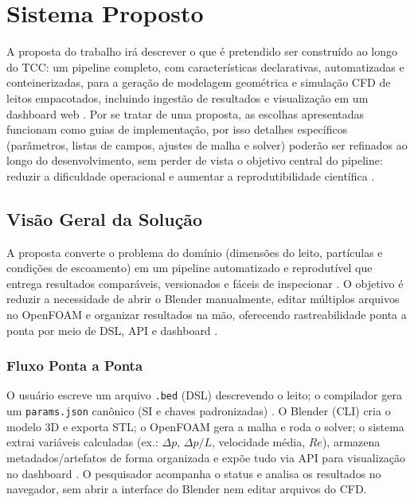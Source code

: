 \chapter{Sistema Proposto}
\label{cap:sistema}

A proposta do trabalho irá descrever o que é pretendido ser construído ao longo do TCC: um pipeline completo, com características declarativas, automatizadas e conteinerizadas, para a geração de modelagem geométrica e simulação CFD de leitos empacotados, incluindo ingestão de resultados e visualização em um dashboard web \cite{blender2021, openfoam2023, fastapi2021, plotly2021, docker2021}. Por se tratar de uma proposta, as escolhas apresentadas funcionam como guias de implementação, por isso detalhes específicos (parâmetros, listas de campos, ajustes de malha e solver) poderão ser refinados ao longo do desenvolvimento, sem perder de vista o objetivo central do pipeline: reduzir a dificuldade operacional e aumentar a reprodutibilidade científica \cite{roache1994}.

\section{Visão Geral da Solução}

A proposta converte o problema do domínio (dimensões do leito, partículas e condições de escoamento) em um pipeline automatizado e reprodutível que entrega resultados comparáveis, versionados e fáceis de inspecionar \cite{fowler2010, openfoam2023}. O objetivo é reduzir a necessidade de abrir o Blender manualmente, editar múltiplos arquivos no OpenFOAM e organizar resultados na mão, oferecendo rastreabilidade ponta a ponta por meio de DSL, API e dashboard \cite{blender2021, openfoam2023, fastapi2021, plotly2021}.

\subsection{Fluxo Ponta a Ponta}

O usuário escreve um arquivo \texttt{.bed} (DSL) descrevendo o leito; o compilador gera um \texttt{params.json} canônico (SI e chaves padronizadas) \cite{fowler2010}. O Blender (CLI) cria o modelo 3D e exporta STL; o OpenFOAM gera a malha e roda o solver; o sistema extrai variáveis calculadas (ex.: $\Delta p$, $\Delta p/L$, velocidade média, $Re$), armazena metadados/artefatos de forma organizada e expõe tudo via API para visualização no dashboard \cite{blender2021, openfoam2023, versteeg2007}. O pesquisador acompanha o status e analisa os resultados no navegador, sem abrir a interface do Blender nem editar arquivos do CFD.

